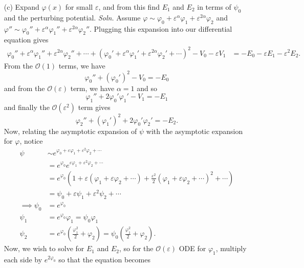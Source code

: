\documentclass{article}
\begin{document}
\begin{itemize}
\begin{itemize}
        \item[(c)] Expand $\varphi(x)$ for small $\varepsilon$, and from this find $E_1$ and $E_2$ in terms of $\psi_0$ and the perturbing potential.
        \newline\newline
        \textit{Soln.} Assume $\varphi \sim \varphi_0 + \varepsilon^{\alpha}\varphi_1 + \varepsilon^{2\alpha}\varphi_2$ and $\varphi'' \sim \varphi_0'' + \varepsilon^{\alpha}\varphi_1'' + \varepsilon^{2\alpha}\varphi_2''$. Plugging this expansion into our differential equation gives
        \begin{align*}
            \varphi_0'' + \varepsilon^{\alpha}\varphi_1'' + \varepsilon^{2\alpha}\varphi_2'' + \cdots  + \left(\varphi_0' + \varepsilon^{\alpha}\varphi_1' + \varepsilon^{2\alpha}\varphi_2' + \cdots\right)^2 - V_0 - \varepsilon V_1 &= -E_0 - \varepsilon E_1 - \varepsilon^2 E_2.
        \end{align*}
        From the $\mathcal{O}(1)$ terms, we have
        \[\varphi_0'' + (\varphi_0')^2 - V_0 = -E_0\]
        and from the $\mathcal{O}(\varepsilon)$ term, we have $\alpha = 1$ and so
        \[\varphi_1'' + 2\varphi_0'\varphi_1' - V_1 = -E_1\]
        and finally the $\mathcal{O}(\varepsilon^2)$ term gives
        \[\varphi_2'' + (\varphi_1')^2 + 2\varphi_0'\varphi_2' = -E_2.\]
        Now, relating the asymptotic expansion of $\psi$ with the asymptotic expansion for $\varphi$, notice
        \begin{align*}
            \psi &\sim e^{\varphi_0 + \varepsilon\varphi_1 + \varepsilon^{2}\varphi_2 + \cdots}\\
            &= e^{\varphi_0}e^{\varepsilon\varphi_1 + \varepsilon^{2}\varphi_2 + \cdots}\\
            &= e^{\varphi_0}\left(1 + \varepsilon(\varphi_1 + \varepsilon \varphi_2 + \cdots) + \frac{\varepsilon^2}{2}(\varphi_1 + \varepsilon \varphi_2 + \cdots)^2 + \cdots\right)\\
            &= \psi_0 + \varepsilon\psi_1 + \varepsilon^2\psi_2 + \cdots\\
            \implies \psi_0 &= e^{\varphi_0}\\
            \psi_1 &= e^{\varphi_0}\varphi_1 = \psi_0\varphi_1\\
            \psi_2 &= e^{\varphi_0}\left(\frac{\varphi_1^2}{2} + \varphi_2\right) =\psi_0\left(\frac{\varphi_1^2}{2} + \varphi_2\right).
        \end{align*}
        Now, we wish to solve for $E_1$ and $E_2$, so for the $\mathcal{O}(\varepsilon)$ ODE for $\varphi_1$, multiply each side by $e^{2\varphi_0}$ so that the equation becomes

\end{itemize}
\end{itemize}
\end{document}
